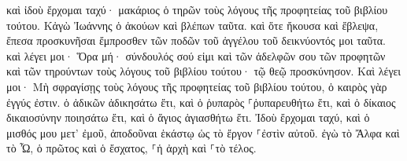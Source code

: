 \documentclass{openreader}
\begin{document}
καὶ ἰδοὺ ἔρχομαι ταχύ· μακάριος ὁ τηρῶν τοὺς λόγους τῆς προφητείας τοῦ βιβλίου τούτου. 
Κἀγὼ Ἰωάννης ὁ ἀκούων καὶ βλέπων ταῦτα. καὶ ὅτε ἤκουσα καὶ ἔβλεψα, ἔπεσα προσκυνῆσαι ἔμπροσθεν τῶν ποδῶν τοῦ ἀγγέλου τοῦ δεικνύοντός μοι ταῦτα. 
καὶ λέγει μοι· Ὅρα μή· σύνδουλός σού εἰμι καὶ τῶν ἀδελφῶν σου τῶν προφητῶν καὶ τῶν τηρούντων τοὺς λόγους τοῦ βιβλίου τούτου· τῷ θεῷ προσκύνησον. 
Καὶ λέγει μοι· Μὴ σφραγίσῃς τοὺς λόγους τῆς προφητείας τοῦ βιβλίου τούτου, ὁ καιρὸς γὰρ ἐγγύς ἐστιν. 
ὁ ἀδικῶν ἀδικησάτω ἔτι, καὶ ὁ ῥυπαρὸς ⸀ῥυπαρευθήτω ἔτι, καὶ ὁ δίκαιος δικαιοσύνην ποιησάτω ἔτι, καὶ ὁ ἅγιος ἁγιασθήτω ἔτι. 
Ἰδοὺ ἔρχομαι ταχύ, καὶ ὁ μισθός μου μετ’ ἐμοῦ, ἀποδοῦναι ἑκάστῳ ὡς τὸ ἔργον ⸀ἐστὶν αὐτοῦ. 
ἐγὼ τὸ Ἄλφα καὶ τὸ Ὦ, ὁ πρῶτος καὶ ὁ ἔσχατος, ⸀ἡ ἀρχὴ καὶ ⸀τὸ τέλος. 
\end{document}
